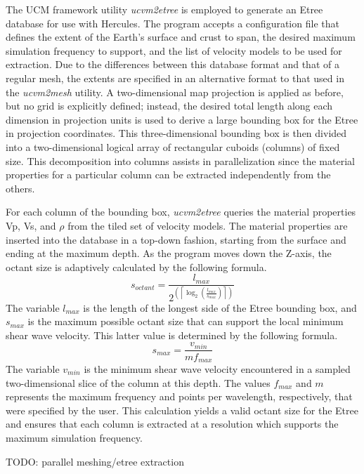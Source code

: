 The UCM framework utility \emph{ucvm2etree} is employed to generate an Etree database for use with Hercules. The program accepts a configuration file that defines the extent of the Earth's surface and crust to span, the desired maximum simulation frequency to support, and the list of velocity models to be used for extraction. Due to the differences between this database format and that of a regular mesh, the extents are specified in an alternative format to that used in the \emph{ucvm2mesh} utility. A two-dimensional map projection is applied as before, but no grid is explicitly defined; instead, the desired total length along each dimension in projection units is used to derive a large bounding box for the Etree in projection coordinates. This three-dimensional bounding box is then divided into a two-dimensional logical array of rectangular cuboids (columns) of fixed size. This decomposition into columns assists in parallelization since the material properties for a particular column can be extracted independently from the others.

For each column of the bounding box, \emph{ucvm2etree} queries the material properties Vp, Vs, and $\rho$ from the tiled set of velocity models. The material properties are inserted into the database in a top-down fashion, starting from the surface and ending at the maximum depth. As the program moves down the Z-axis, the octant size is adaptively calculated by the following formula.
\begin{equation*}
s_{octant} = \frac{l_{max}}{ 2^{\left( \left\lceil \log_{2}(\frac{l_{max}}{s_{max}}) \right\rceil \right)} }
\end{equation*}
The variable $l_{max}$ is the length of the longest side of the Etree bounding box, and $s_{max}$ is the maximum possible octant size that can support the local minimum shear wave velocity. This latter value is determined by the following formula.
\begin{equation*}
s_{max} = \frac{v_{min}}{m f_{max}}
\end{equation*}
The variable $v_{min}$ is the minimum shear wave velocity encountered in a sampled two-dimensional slice of the column at this depth. The values $f_{max}$ and $m$ represents the maximum frequency and points per wavelength, respectively, that were specified by the user. This calculation yields a valid octant size for the Etree and ensures that each column is extracted at a resolution which supports the maximum simulation frequency.

TODO: parallel meshing/etree extraction

